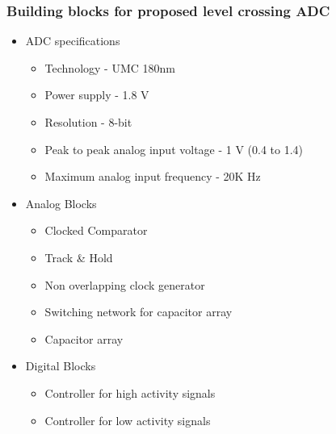 \begin{frame}
	\frametitle{Building blocks for proposed level crossing ADC} \footnotesize
	\begin{itemize} 
		\item{ ADC specifications}
			\begin{itemize} \scriptsize
				\item{ Technology - UMC 180nm } \\
				\item{ Power supply - 1.8 V } \\
				\item{ Resolution - 8-bit  } \\
				\item{ Peak to peak analog input voltage - 1 V (0.4 to 1.4)} \\
				\item{ Maximum analog input frequency - 20K Hz } \\
			\end{itemize}
		\item{ Analog Blocks }\\
			\begin{itemize} \scriptsize
				\item{ Clocked Comparator } \\
				\item{ Track \& Hold } \\
				\item{ Non overlapping clock generator } \\
				\item{ Switching network for capacitor array } \\
				\item{ Capacitor array  } \\
			\end{itemize}
		\item{ Digital Blocks }
			\begin{itemize} \scriptsize
				\item{ Controller for high activity signals } \\
				\item{ Controller for low activity signals } \\
			\end{itemize}	
	\end{itemize}
\end{frame}
